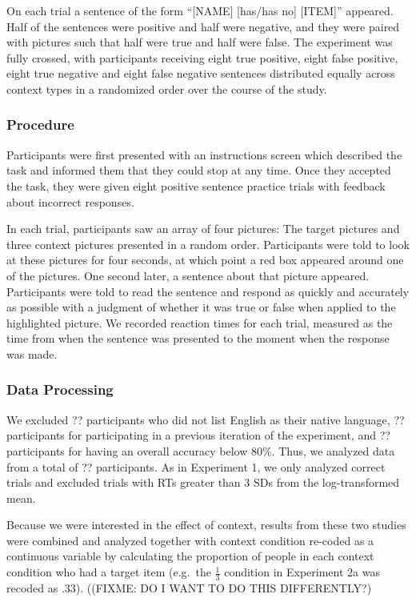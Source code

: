 \documentclass[man]{apa2}
\begin{document}
On each trial a sentence of the form ``[NAME] [has/has no] [ITEM]'' appeared.  Half of the sentences were positive and half were negative, and they were paired with pictures such that half were true and half were false.  The experiment was fully crossed, with participants receiving eight true positive, eight false positive, eight true negative and eight false negative sentences distributed equally across context types in a randomized order over the course of the study.  

\subsubsection{Procedure}
Participants were first presented with an instructions screen which described the task and informed them that they could stop at any time.  Once they accepted the task, they were given eight positive sentence practice trials with feedback about incorrect responses. 

In each trial, participants saw an array of four pictures: The target pictures and three context pictures presented in a random order.  Participants were told to look at these pictures for four seconds, at which point a red box appeared around one of the pictures.  One second later, a sentence about that picture appeared.  Participants were told to read the sentence and respond as quickly and accurately as possible with a judgment of whether it was true or false when applied to the highlighted picture.  We recorded reaction times for each trial, measured as the time from when the sentence was presented to the moment when the response was made.

 
 \subsubsection{Data Processing}
We excluded ?? participants who did not list English as their native language, ?? participants for participating in a previous iteration of the experiment, and ?? participants for having an overall accuracy below 80\%.  Thus, we analyzed data from a total of ?? participants. As in Experiment 1, we only analyzed correct trials and excluded trials with RTs greater than 3 SDs from the log-transformed mean. 

Because we were interested in the effect of context, results from these two studies were combined and analyzed together with context condition re-coded as a continuous variable by calculating the proportion of people in each context condition who had a target item (e.g.\ the $\frac{1}{3}$ condition in Experiment 2a was recoded as .33). ((FIXME: DO I WANT TO DO THIS DIFFERENTLY?)
\end{document}
